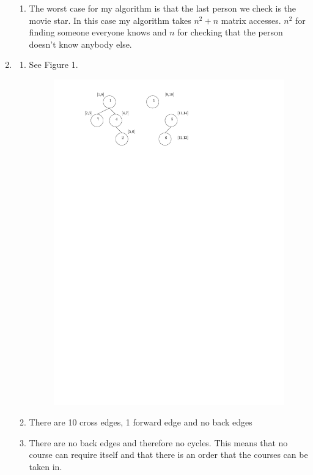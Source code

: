 \documentclass[10pt,a4paper]{article}
\begin{document}
\begin{enumerate}
\begin{enumerate}
\item
The worst case for my algorithm is that the last person we check is the movie star. In this case my algorithm takes $n^2 + n$ matrix accesses. 
$n^2$ for finding someone everyone knows and 
$n$ for checking that the person doesn't know anybody else.
\end{enumerate}
\item
\begin{enumerate}
\item See Figure 1.
\begin{figure}[htbp]
\centering
\includegraphics[width=\textwidth]{./A3Q2}
\caption{}
\label{fig:2a}
\end{figure}
\item
There are 10 cross edges, 1 forward edge and no back edges
\item There are no back edges and therefore no cycles. This means that no course can require itself and that there is an order that the courses can be taken in.

\end{enumerate}
\end{enumerate}
\end{document}
